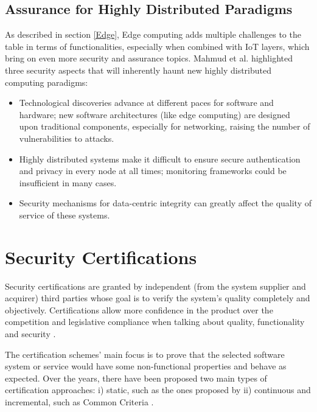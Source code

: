 \subsection{Assurance for Highly Distributed Paradigms}
As described in section \ref{Edge}, Edge computing adds multiple challenges to the table in terms of functionalities, especially when combined with IoT layers, which bring on even more security and assurance topics. Mahmud et al. \cite{mahmud2018fog} highlighted three security aspects that will inherently haunt new highly distributed computing paradigms:
\begin{itemize}

\item Technological discoveries advance at different paces for software and hardware; new software architectures (like edge computing) are designed upon traditional components, especially for networking, raising the number of vulnerabilities to attacks.

\item Highly distributed systems make it difficult to ensure secure authentication and privacy in every node at all times; monitoring frameworks could be insufficient in many cases.

\item Security mechanisms for data-centric integrity can greatly affect the quality of service of these systems.

\end{itemize}


\section{Security Certifications}
Security certifications are granted by independent (from the system supplier and acquirer) third parties whose goal is to verify the system's quality completely and objectively. Certifications allow more confidence in the product over the competition and legislative compliance when talking about quality, functionality and security \cite{heck2010software}.

The certification schemes' main focus is to prove that the selected software system or service would have some non-functional properties and behave as expected. 
Over the years, there have been proposed two main types of certification approaches: i) static, such as the ones proposed by \cite{anisetti2013test}\cite{CSATrustSTAR} ii) continuous and incremental, such as Common Criteria \cite{anisetti2017semi}\cite{infrastructure2002common}. 

